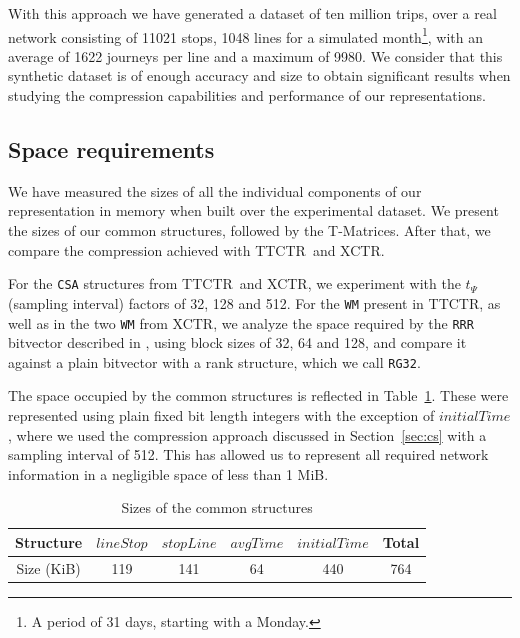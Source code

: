 \documentclass[runningheads]{llncs}
\newcommand{\acumm}{T-Matrices} %
\newcommand{\ctr}{XCTR}
\newcommand{\ttctr}{TTCTR}
\begin{document}
With this approach we have generated a dataset of ten million trips, over a real network consisting of 11021 stops, 1048 lines for a simulated month\footnote{A period of 31 days, starting with a Monday.}, with an average of 1622 journeys per line and a maximum of 9980. We consider that this synthetic dataset is of enough accuracy and size to obtain significant results when studying the compression capabilities and performance of our representations.

\subsection{Space requirements}
\label{sec:space}
We have measured the sizes of all the individual components of our representation in memory when built over the experimental dataset. We present the sizes of our common structures, followed by the \acumm\marginpar{Missing \acumm~sizes!}. After that, we compare the compression achieved with \ttctr~and \ctr.

For the \texttt{CSA} structures from \ttctr~and \ctr, we experiment with the $t_\Psi$ (sampling interval) factors of 32, 128 and 512. For the \texttt{WM} present in \ttctr, as well as in the two \texttt{WM} from \ctr, we analyze the space required by the \texttt{RRR} bitvector described in \cite{Raman:2002:SID:545381.545411}, using block sizes of 32, 64 and 128, and compare it against a plain bitvector with a rank structure, which we call \texttt{RG32}.

The space occupied by the common structures is reflected in Table~\ref{tab:commons}. These were represented using plain fixed bit length integers with the exception of $initialTime$, where we used the compression approach discussed in Section~\ref{sec:cs} with a sampling interval of 512. This has allowed us to represent all required network information in a negligible space of less than 1 MiB.

\begin{table}
    \centering
    \caption{Sizes of the common structures}
    \label{tab:commons}
    \begin{tabular}{|c|c|c|c|c|c|}
    \hline
        Structure & $lineStop$ & $stopLine$ & $avgTime$ & $initialTime$ & Total \\
        \hline
        Size (KiB) & 119 & 141 & 64 & 440 & 764 \\
    \hline
    \end{tabular}
\end{table}
\end{document}
